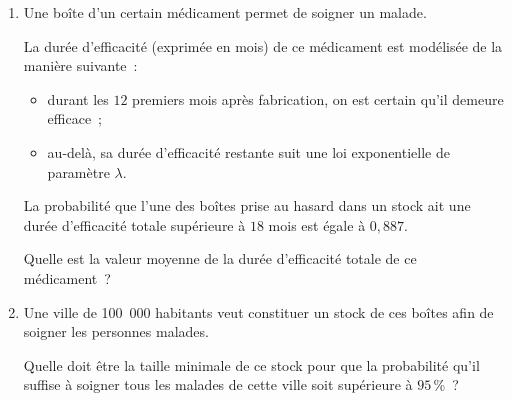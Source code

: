 \begin{enumerate}
     \item Une boîte d'un certain médicament permet de soigner un malade.
     \par
     La durée d'efficacité (exprimée en mois) de ce médicament est modélisée de la manière
     suivante~:
     \begin{itemize}
          \item durant les $12$ premiers mois après fabrication, on est certain qu'il demeure efficace~;
          \item au-delà, sa durée d'efficacité restante suit une loi exponentielle de paramètre
          $\lambda$.
     \end{itemize}
     La probabilité que l'une des boîtes prise au hasard dans un stock ait une durée d'efficacité totale supérieure à $18$ mois est égale à $0,887$.
     \par
     Quelle est la valeur moyenne de la durée d'efficacité totale de ce médicament~?
     \item Une ville de 100~000 habitants veut constituer un stock de ces boîtes afin de soigner les personnes malades.
     \par
     Quelle doit être la taille minimale de ce stock pour que la probabilité qu'il suffise à soigner tous les malades de cette ville soit supérieure à $95$\,\%~?
\end{enumerate}

